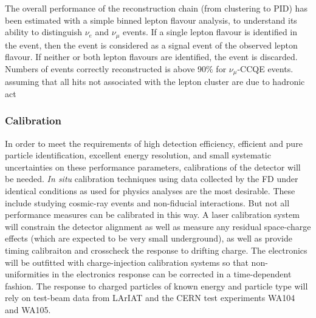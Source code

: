 The overall performance of the reconstruction chain (from clustering to PID) has been estimated with a simple binned lepton flavour analysis, 
to understand its ability to distinguish $\nu_{e}$ and $\nu_{\mu}$ events.
If a single lepton flavour is identified in the event, then the event is considered as a signal event of the observed lepton flavour. 
If neither or both lepton flavours are identified, the event is discarded.
Numbers of events correctly reconstructed is above 90$\%$ for $\nu_{\mu}$-CCQE events.
assuming that all hits not associated with the lepton cluster are due to hadronic act%


\subsubsection{Calibration}

In order to meet the requirements of high detection efficiency, efficient and
pure particle identification, excellent energy resolution, and small systematic
uncertainties on these performance parameters, calibrations of the detector
will be needed.  {\it In situ} calibration techniques using data collected by the FD
under identical conditions as used for physics analyses are the most desirable.
These include studying cosmic-ray events and non-fiducial interactions.  But not
all performance measures can be calibrated in this way.  A laser calibration system
will constrain the detector alignment as well as measure any residual space-charge effects
(which are expected to be very small underground), as well as provide timing calibraiton
and crosscheck the response to drifting charge.  The electronics will be outfitted with
charge-injection calibration systems so that non-uniformities in the electronics response
can be corrected in a time-dependent fashion.  The response to charged particles of known
energy and particle type will rely on test-beam data from LArIAT and the CERN test
experiments WA104 and WA105.



